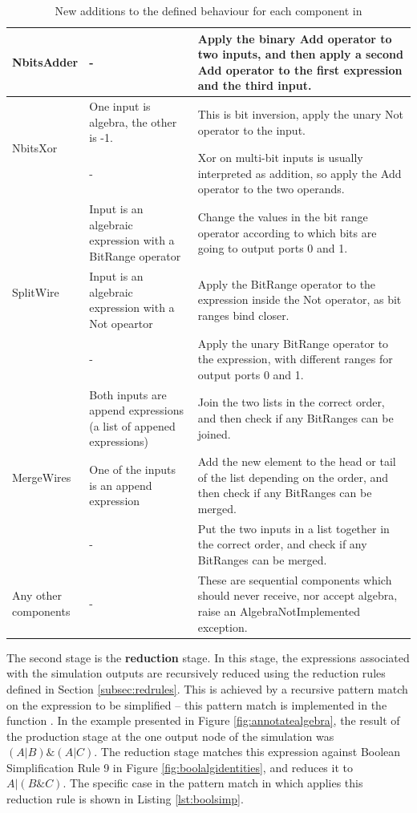 \begin{table}[!ht]
{\begin{tabular}{|m{2cm}|m{4cm}|m{8cm}|}
        NbitsAdder & - & Apply the binary Add operator to two inputs, and then apply a second Add operator to the first expression and the third input. \\ \hline
        \multirow{2}{*}{NbitsXor} & One input is algebra, the other is -1. & This is bit inversion, apply the unary Not operator to the input. \\ \cline{2-3}
        ~ & - & Xor on multi-bit inputs is usually interpreted as addition, so apply the Add operator to the two operands. \\ \hline
        \multirow{3}{*}{SplitWire} & Input is an algebraic expression with a BitRange operator & Change the values in the bit range operator according to which bits are going to output ports 0 and 1. \\ \cline{2-3}
        ~ & Input is an algebraic expression with a Not opeartor & Apply the BitRange operator to the expression inside the Not operator, as bit ranges bind closer. \\ \cline{2-3}
        ~ & - & Apply the unary BitRange operator to the expression, with different ranges for output ports 0 and 1. \\ \hline
        \multirow{3}{*}{MergeWires} & Both inputs are append expressions (a list of appened expressions) & Join the two lists in the correct order, and then check if any BitRanges can be joined. \\ \cline{2-3}
        ~ & One of the inputs is an append expression & Add the new element to the head or tail of the list depending on the order, and then check if any BitRanges can be merged. \\ \cline{2-3}
        ~ & - & Put the two inputs in a list together in the correct order, and check if any BitRanges can be merged. \\ \hline
        \shortstack{Any other\\ components} & - & These are sequential components which should never receive, nor accept algebra, raise an AlgebraNotImplemented exception. \\ \hline
    \end{tabular}}
    \caption{New additions to the defined behaviour for each component in }
    \label{tab:fastReduce}
\end{table}

The second stage is the \textbf{reduction} stage. In this stage, the expressions associated with the simulation outputs are recursively reduced using the reduction rules defined in Section \ref{subsec:redrules}. This is achieved by a recursive pattern match on the expression to be simplified -- this pattern match is implemented in the function . In the example presented in Figure \ref{fig:annotatealgebra}, the result of the production stage at the one output node of the simulation was $(A | B) \& (A | C)$. The reduction stage matches this expression against Boolean Simplification Rule 9 in Figure \ref{fig:boolalgidentities}, and reduces it to $A|(B\&C)$. The specific case in the pattern match in  which applies this reduction rule is shown in Listing \ref{lst:boolsimp}.

